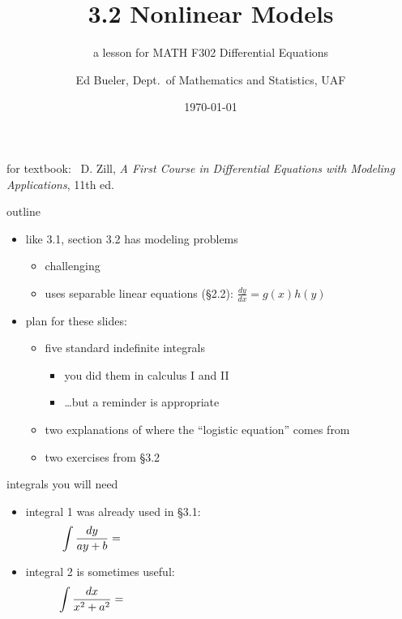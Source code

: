 \documentclass{beamer}
\title{3.2 Nonlinear Models}
\subtitle{a lesson for MATH F302 Differential Equations}
\author{Ed Bueler, Dept.~of Mathematics and Statistics, UAF}
\date{\tiny \today}
\begin{document}


\begin{frame}
\titlepage

\centerline{\tiny for textbook: \, D. Zill, \emph{A First Course in Differential Equations with Modeling Applications}, 11th ed.}
\end{frame}


\begin{frame}{outline}

\begin{itemize}
\item like 3.1, section 3.2 has modeling problems
    \begin{itemize}
    \item challenging
    \item uses separable linear equations (\S2.2): $\frac{dy}{dx} = g(x) h(y)$
    \end{itemize}
\item plan for these slides:
    \begin{itemize}
    \item five standard indefinite integrals
        \begin{itemize}
        \item you did them in calculus I and II
        \item \dots but a reminder is appropriate
        \end{itemize}
    \item two explanations of where the ``logistic equation'' comes from
    \item two exercises from \S3.2
    \end{itemize} 
\end{itemize}
\end{frame}


\begin{frame}{integrals you will need}

\begin{itemize}
\item {\color{blue} integral 1} was already used in \S3.1:
    $$\int \frac{dy}{ay+b} = \hspace{80mm}$$

\vspace{10mm}
\item {\color{blue} integral 2} is sometimes useful:
    $$\int \frac{dx}{x^2+a^2} = \hspace{80mm}$$

\vspace{25mm}
\end{itemize}
\end{frame}
\end{document}

